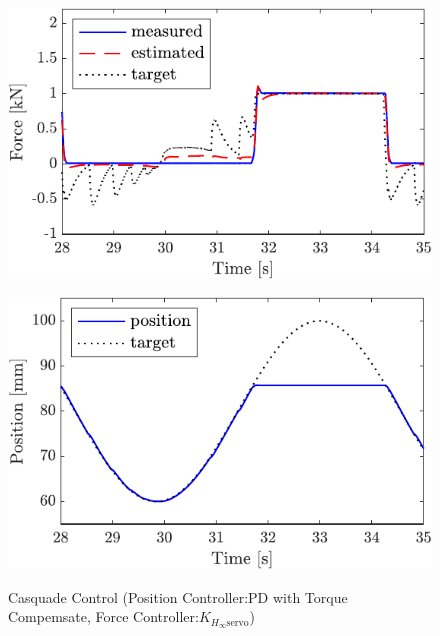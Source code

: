 \begin{figure}[t]
    \begin{minipage}{\minipageratio\hsize}
    \centering
        \includegraphics[keepaspectratio, scale = \minifigscale]{contents/IntegrationControl/figure/SECASQ/crop-FBcsqtch_JFPS4_trq_force.pdf}
        \label{fig5:crop-FBcsqtch_JFPS4_trq_force}
    \end{minipage}
    \begin{minipage}{\minipageratio\hsize}
    \centering
        \includegraphics[keepaspectratio, scale = \minifigscale]{contents/IntegrationControl/figure/SECASQ/crop-FBcsqtch_JFPS4_trq_pos.pdf}
        \label{fig5:crop-FBcsqtch_JFPS4_trq_pos}
    \end{minipage}
    \caption{Casquade Control (Position Controller:PD with Torque Compemsate, Force Controller:$K_{H_\infty\mathrm{servo}}$)}  
    \label{fig5:crop-FBcsqtch_JFPS4_trq}
\end{figure}


